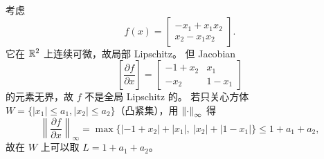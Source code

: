\begin{example}\label{ex:lipschitz-poly}
  考虑
  \begin{equation}
    f(x)=\begin{bmatrix}
      -x_1+x_1x_2\\
      x_2-x_1x_2
    \end{bmatrix}.
  \end{equation}
  它在 $\mathbb{R}^2$ 上连续可微，故局部 Lipschitz。
  但 Jacobian
  \begin{equation}
    \left[\frac{\partial f}{\partial x}\right]
    =\begin{bmatrix}
      -1+x_2 & x_1\\
      -x_2 & 1-x_1
    \end{bmatrix}
  \end{equation}
  的元素无界，故 $f$ 不是全局 Lipschitz 的。
  若只关心方体 $W=\{|x_1|\le a_1,|x_2|\le a_2\}$（凸紧集），用 $\left\lVert\cdot\right\rVert_\infty$ 得
  \begin{equation}
    \left\|\frac{\partial f}{\partial x}\right\|_\infty
    =\max\{|-1+x_2|+|x_1|,\ |x_2|+|1-x_1|\}
    \le 1+a_1+a_2,
  \end{equation}
  故在 $W$ 上可以取 $L=1+a_1+a_2$。
  \cite[Example 3.1]{khalilNonlinearSystems}
\end{example}

